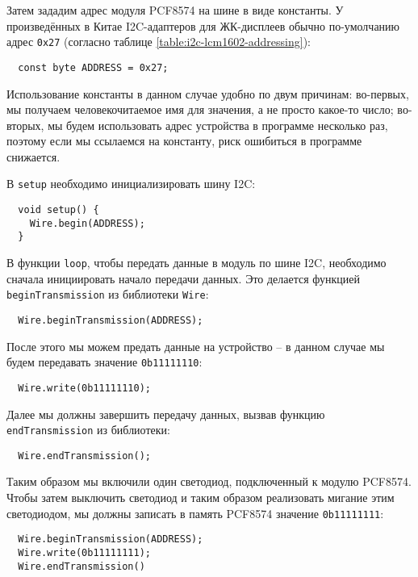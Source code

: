 \documentclass[../sparc.tex]{subfiles}
\begin{document}
Затем зададим адрес модуля PCF8574 на шине в виде константы.  У произведённых в
Китае I2C-адаптеров для ЖК-дисплеев обычно по-умолчанию адрес \texttt{0x27}
(согласно таблице \ref{table:i2c-lcm1602-addressing}):

\begin{verbatim}
  const byte ADDRESS = 0x27;
\end{verbatim}

Использование константы в данном случае удобно по двум причинам: во-первых, мы
получаем человекочитаемое имя для значения, а не просто какое-то число;
во-вторых, мы будем использовать адрес устройства в программе несколько раз,
поэтому если мы ссылаемся на константу, риск ошибиться в программе снижается.

В \texttt{setup} необходимо инициализировать шину I2C:

\begin{verbatim}
  void setup() {
    Wire.begin(ADDRESS);
  }
\end{verbatim}

В функции \texttt{loop}, чтобы передать данные в модуль по шине I2C, необходимо
сначала инициировать начало передачи данных.  Это делается функцией
\texttt{beginTransmission} из библиотеки \texttt{Wire}:

\begin{verbatim}
  Wire.beginTransmission(ADDRESS);
\end{verbatim}

После этого мы можем предать данные на устройство -- в данном случае мы будем
передавать значение \texttt{0b11111110}:

\begin{verbatim}
  Wire.write(0b11111110);
\end{verbatim}

Далее мы должны завершить передачу данных, вызвав функцию
\texttt{endTransmission} из библиотеки:

\begin{verbatim}
  Wire.endTransmission();
\end{verbatim}

Таким образом мы включили один светодиод, подключенный к модулю PCF8574.  Чтобы
затем выключить светодиод и таким образом реализовать мигание этим светодиодом,
мы должны записать в память PCF8574 значение \texttt{0b11111111}:

\begin{verbatim}
  Wire.beginTransmission(ADDRESS);
  Wire.write(0b11111111);
  Wire.endTransmission()
\end{verbatim}
\end{document}
